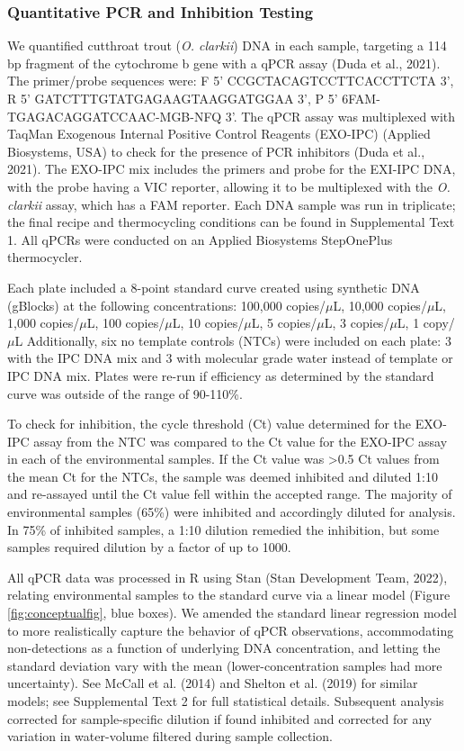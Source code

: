 \documentclass[
]{article}
\begin{document}
\hypertarget{quantitative-pcr-and-inhibition-testing}{%
\subsubsection{Quantitative PCR and Inhibition
Testing}\label{quantitative-pcr-and-inhibition-testing}}

We quantified cutthroat trout (\emph{O. clarkii}) DNA in each sample,
targeting a 114 bp fragment of the cytochrome b gene with a qPCR assay
(Duda et al., 2021). The primer/probe sequences were: F 5'
CCGCTACAGTCCTTCACCTTCTA 3', R 5' GATCTTTGTATGAGAAGTAAGGATGGAA 3', P 5'
6FAM-TGAGACAGGATCCAAC-MGB-NFQ 3'. The qPCR assay was multiplexed with
TaqMan Exogenous Internal Positive Control Reagents (EXO-IPC) (Applied
Biosystems, USA) to check for the presence of PCR inhibitors (Duda et
al., 2021). The EXO-IPC mix includes the primers and probe for the
EXI-IPC DNA, with the probe having a VIC reporter, allowing it to be
multiplexed with the \emph{O. clarkii} assay, which has a FAM reporter.
Each DNA sample was run in triplicate; the final recipe and
thermocycling conditions can be found in Supplemental Text 1. All qPCRs
were conducted on an Applied Biosystems StepOnePlus thermocycler.

Each plate included a 8-point standard curve created using synthetic DNA
(gBlocks) at the following concentrations: 100,000 copies/\(\mu\)L,
10,000 copies/\(\mu\)L, 1,000 copies/\(\mu\)L, 100 copies/\(\mu\)L, 10
copies/\(\mu\)L, 5 copies/\(\mu\)L, 3 copies/\(\mu\)L, 1 copy/\(\mu\)L
Additionally, six no template controls (NTCs) were included on each
plate: 3 with the IPC DNA mix and 3 with molecular grade water instead
of template or IPC DNA mix. Plates were re-run if efficiency as
determined by the standard curve was outside of the range of 90-110\%.

To check for inhibition, the cycle threshold (Ct) value determined for
the EXO-IPC assay from the NTC was compared to the Ct value for the
EXO-IPC assay in each of the environmental samples. If the Ct value was
\textgreater0.5 Ct values from the mean Ct for the NTCs, the sample was
deemed inhibited and diluted 1:10 and re-assayed until the Ct value fell
within the accepted range. The majority of environmental samples (65\%)
were inhibited and accordingly diluted for analysis. In 75\% of
inhibited samples, a 1:10 dilution remedied the inhibition, but some
samples required dilution by a factor of up to 1000.

All qPCR data was processed in R using Stan (Stan Development Team,
2022), relating environmental samples to the standard curve via a linear
model (Figure \ref{fig:conceptualfig}, blue boxes). We amended the
standard linear regression model to more realistically capture the
behavior of qPCR observations, accommodating non-detections as a
function of underlying DNA concentration, and letting the standard
deviation vary with the mean (lower-concentration samples had more
uncertainty). See McCall et al. (2014) and Shelton et al. (2019) for
similar models; see Supplemental Text 2 for full statistical details.
Subsequent analysis corrected for sample-specific dilution if found
inhibited and corrected for any variation in water-volume filtered
during sample collection.
\end{document}

